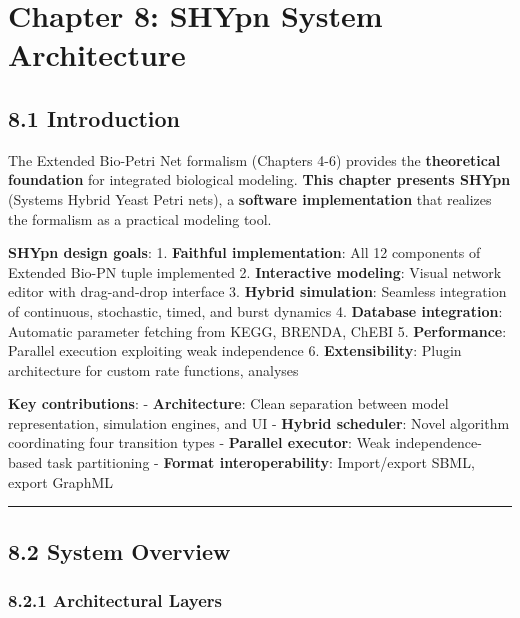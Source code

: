 \hypertarget{chapter-8-shypn-system-architecture}{%
\chapter{Chapter 8: SHYpn System
Architecture}\label{chapter-8-shypn-system-architecture}}

\hypertarget{introduction}{%
\section{8.1 Introduction}\label{introduction}}

The Extended Bio-Petri Net formalism (Chapters 4-6) provides the
\textbf{theoretical foundation} for integrated biological modeling.
\textbf{This chapter presents SHYpn} (Systems Hybrid Yeast Petri nets),
a \textbf{software implementation} that realizes the formalism as a
practical modeling tool.

\textbf{SHYpn design goals}: 1. \textbf{Faithful implementation}: All 12
components of Extended Bio-PN tuple implemented 2. \textbf{Interactive
modeling}: Visual network editor with drag-and-drop interface 3.
\textbf{Hybrid simulation}: Seamless integration of continuous,
stochastic, timed, and burst dynamics 4. \textbf{Database integration}:
Automatic parameter fetching from KEGG, BRENDA, ChEBI 5.
\textbf{Performance}: Parallel execution exploiting weak independence 6.
\textbf{Extensibility}: Plugin architecture for custom rate functions,
analyses

\textbf{Key contributions}: - \textbf{Architecture}: Clean separation
between model representation, simulation engines, and UI -
\textbf{Hybrid scheduler}: Novel algorithm coordinating four transition
types - \textbf{Parallel executor}: Weak independence-based task
partitioning - \textbf{Format interoperability}: Import/export SBML,
export GraphML

\begin{center}\rule{0.5\linewidth}{0.5pt}\end{center}

\hypertarget{system-overview}{%
\section{8.2 System Overview}\label{system-overview}}

\hypertarget{architectural-layers}{%
\subsection{8.2.1 Architectural Layers}\label{architectural-layers}}


